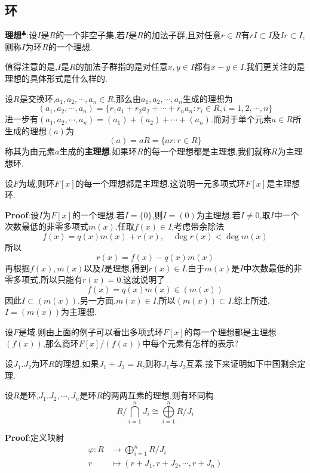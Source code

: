 \subsection{环}
\textbf{理想}$^\clubsuit $:设$I$是$R$的一个非空子集,若$I$是$R$的加法子群,且对任意$r\in R$有$rI\subset I$及$Ir\subset I$,则称$I$为环$R$的一个理想.\par
值得注意的是,$I$是$R$的加法子群指的是对任意$x,y\in I$都有$x-y\in I$.我们更关注的是理想的具体形式是什么样的.\par
设$R$是交换环,$a_1,a_2,\cdots,a_n\in R$,那么由$a_1,a_2,\cdots,a_n$生成的理想为
$$
(a_1,a_2,\cdots,a_n)=\{r_1a_1+r_2a_2+\cdots+r_na_n:r_i\in R,i=1,2,\cdots,n\}
$$
进一步有$(a_1,a_2,\cdots,a_n)=(a_1)+(a_2)+\cdots+(a_n)$.而对于单个元素$a\in R$所生成的理想$(a)$为
$$
(a)=aR=\{ar:r\in R\}
$$
称其为由元素$a$生成的\textbf{主理想}.如果环$R$的每一个理想都是主理想,我们就称$R$为主理想环.\par
\begin{tcolorbox}[colback=KuangNei,colframe=BianKuang,title=\textbf{多项式环的理想},sharpish corners]
    设$F$为域,则环$F[x]$的每一个理想都是主理想.这说明一元多项式环$F[x]$是主理想环.
\end{tcolorbox}
\textbf{Proof}:设$I$为$F[x]$的一个理想.若$I=\{0\}$,则$I=(0)$为主理想.若$I\neq 0$,取$I$中一个次数最低的非零多项式$m(x)$.任取$f(x)\in I$,考虑带余除法
$$
f(x)=q(x)m(x)+r(x),\quad \deg r(x)<\deg m(x)
$$
所以
$$
r(x)=f(x)-q(x)m(x)
$$
再根据$f(x),m(x)$以及$I$是理想,得到$r(x)\in I$.由于$m(x)$是$I$中次数最低的非零多项式,所以只能有$r(x)=0$.这就说明了
$$
f(x)=q(x)m(x)\in (m(x))
$$
因此$I\subset (m(x))$.另一方面,$m(x)\in I$,所以$(m(x))\subset I$.综上所述,$I=(m(x))$为主理想.\par
设$F$是域.则由上面的例子可以看出多项式环$F[x]$的每一个理想都是主理想$(f(x))$,那么商环$F[x]/(f(x))$中每个元素有怎样的表示?\par
设$J_1.J_2$为环$R$的理想,如果$J_1+J_2=R$,则称$J_1$与$J_2$互素.接下来证明如下中国剩余定理.
\begin{tcolorbox}[colback=KuangNei,colframe=BianKuang,title=\textbf{中国剩余定理},sharpish corners]
    设$R$是环,$J_1.J_2,\cdots,J_n$是环$R$的两两互素的理想,则有环同构
    $$
    R\big/\bigcap_{i=1}^n J_i\cong \bigoplus\limits_{i=1}^n R/J_i 
    $$
\end{tcolorbox}
\textbf{Proof}:定义映射
$$
\begin{aligned}
    \varphi :R &\to \bigoplus\limits_{i=1}^n R/J_i\\
               r &\mapsto (r+J_1,r+J_2,\cdots,r+J_n)
\end{aligned}
$$
